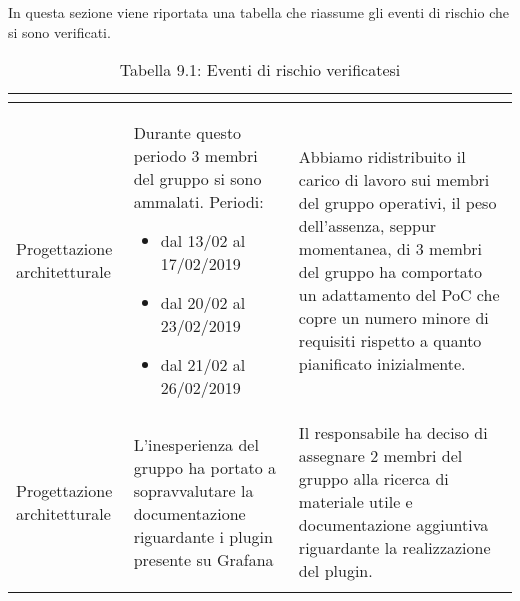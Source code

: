 In questa sezione viene riportata una tabella che riassume gli eventi di rischio che si sono verificati.
\\
\renewcommand{\arraystretch}{1.5}
\begin{longtable}{| m{7em} | m{15em} | m{16em} |}
\hline
\rowcolor{title_row}
\textbf{\color{title_text}{Periodo}}  & \textbf{\color{title_text}{Evento}} & \textbf{\color{title_text}{Reazione}} \\
\endhead
\hline
Progettazione architetturale & Durante questo periodo 3 membri del gruppo si sono ammalati. Periodi:\begin{itemize}
	\item dal 13/02 al 17/02/2019
	\item dal 20/02 al 23/02/2019
	\item dal 21/02 al 26/02/2019
\end{itemize} & Abbiamo ridistribuito il carico di lavoro sui membri del gruppo operativi,
il peso dell'assenza, seppur momentanea, di 3 membri del gruppo ha comportato un adattamento del PoC che copre un numero minore di requisiti rispetto a quanto pianificato inizialmente. \\
\hline
Progettazione architetturale & L'inesperienza del gruppo ha portato a sopravvalutare la documentazione riguardante i plugin presente su Grafana & Il responsabile ha deciso di assegnare 2 membri del gruppo alla ricerca di materiale utile e documentazione aggiuntiva riguardante la realizzazione del plugin. \\
\hline
\caption{Tabella 9.1: Eventi di rischio verificatesi\label{}}
\end{longtable}
\renewcommand{\arraystretch}{1}
\newpage
